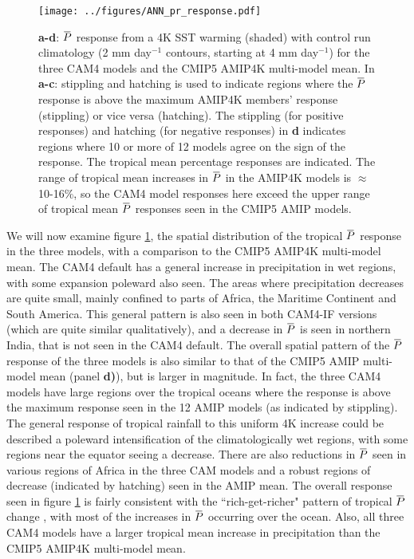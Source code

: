 \documentclass[letterpaper,12pt,titlepage,oneside,final]{book}
\newcommand{\overbar}[1]{\mkern 1.5mu\overline{\mkern-1.5mu#1\mkern-1.5mu}\mkern 1.5mu}
\begin{document}
\begin{figure}[H]
\centering
\noindent\texttt{[image: ../figures/ANN\_pr\_response.pdf]}\hfill
\caption{\footnotesize \textbf{a-d}: $\overbar{P}$ response from a 4K SST warming (shaded) with control run climatology (2 mm day$^{-1}$ contours, starting at 4 mm day$^{-1}$) for the three CAM4 models and the CMIP5 AMIP4K multi-model mean. In \textbf{a-c}: stippling and hatching is used to indicate regions where the $\overbar{P}$ response is above the maximum AMIP4K members' response (stippling) or vice versa (hatching). The stippling (for positive responses) and hatching (for negative responses) in \textbf{d} indicates regions where 10 or more of 12 models agree on the sign of the response. The tropical mean percentage responses are indicated. The range of tropical mean increases in $\overbar{P}$ in the AMIP4K models is $\approx$ 10-16\%, so the CAM4 model responses here exceed the upper range of tropical mean $\overbar{P}$ responses seen in the CMIP5 AMIP models.}
\label{fig:presponse}
\end{figure}
We will now examine figure \ref{fig:presponse}, the spatial distribution of the tropical $\overbar{P}$ response in the three models, with a comparison to the CMIP5 AMIP4K multi-model mean. The CAM4 default has a general increase in precipitation in wet regions, with some expansion poleward also seen. The areas where precipitation decreases are quite small, mainly confined to parts of Africa, the Maritime Continent and South America. This general pattern is also seen in both CAM4-IF versions (which are quite similar qualitatively), and a decrease in $\overbar{P}$ is seen in northern India, that is not seen in the CAM4 default. The overall spatial pattern of the $\overbar{P}$ response of the three models is also similar to that of the CMIP5 AMIP multi-model mean (panel \textbf{d)}), but is larger in magnitude. In fact, the three CAM4 models have large regions over the tropical oceans where the response is above the maximum response seen in the 12 AMIP models (as indicated by stippling). The general response of tropical rainfall to this uniform 4K increase could be described a poleward intensification of the climatologically wet regions, with some regions near the equator seeing a decrease. There are also reductions in $\overbar{P}$ seen in various regions of Africa in the three CAM models and a robust regions of decrease (indicated by hatching) seen in the AMIP mean. The overall response seen in figure \ref{fig:presponse} is fairly consistent with the ``rich-get-richer" pattern of tropical $\overbar{P}$ change \citep{held_robust_2006,chou_evaluating_2009}, with most of the increases in $\overbar{P}$ occurring over the ocean. Also, all three CAM4 models have a larger tropical mean increase in precipitation than the CMIP5 AMIP4K multi-model mean.
\end{document}
